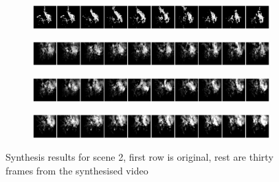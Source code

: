 \documentclass{article}
\begin{document}
\begin{figure}
	\centering
	\begin{subfigure}{\textwidth}
		\includegraphics[width=\textwidth]{visuals/Underconstrained_flicker_g1_c28_f10.png}
	\end{subfigure}
	\begin{subfigure}{\textwidth}
		\includegraphics[width=\textwidth]{visuals/Underconstrained_flicker_g1_c28_s0_synth.png}
	\end{subfigure}
	\begin{subfigure}{\textwidth}
		\includegraphics[width=\textwidth]{visuals/Underconstrained_flicker_g1_c28_s10_synth.png}
	\end{subfigure}
	\begin{subfigure}{\textwidth}
		\includegraphics[width=\textwidth]{visuals/Underconstrained_flicker_g1_c28_s20_synth.png}
	\end{subfigure}
	\caption{Synthesis results for scene 2, first row is original, rest are thirty frames from the synthesised video}
	\label{fig:synthesis-2}
\end{figure}
\end{document}
